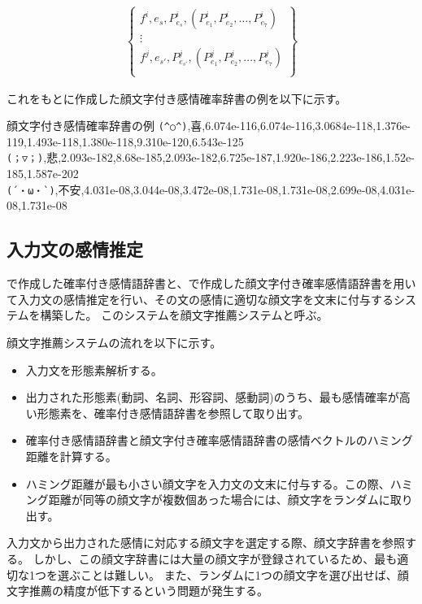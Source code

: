 \documentclass[11pt,a4j]{jsarticle}
\begin{document}
\begin{eqnarray*}
  \left\{
   \begin{array}{c}
     f^i, e_s, P^i_{e_s}, (P^i_{e_1}, P^i_{e_2}, \ldots, P^i_{e_7})\\
     \vdots \\
     f^j, e_{s'}, P^j_{e_{s'}}, (P^j_{e_1}, P^j_{e_2}, \ldots, P^j_{e_7})\\
   \end{array}
  \right\}
\end{eqnarray*}


これをもとに作成した顔文字付き感情確率辞書の例を以下に示す。

\begin{itembox}[l]{顔文字付き感情確率辞書の例}
\verb|(^○^)|,喜,6.074e-116,6.074e-116,3.0684e-118,1.376e-119,1.493e-118,1.380e-118,9.310e-120,6.543e-125\\
\verb|(；▽；)|,悲,2.093e-182,8.68e-185,2.093e-182,6.725e-187,1.920e-186,2.223e-186,1.52e-185,1.587e-202\\
\verb|(´・ω・`)|,不安,4.031e-08,3.044e-08,3.472e-08,1.731e-08,1.731e-08,2.699e-08,4.031e-08,1.731e-08\\
\end{itembox}

\subsection{入力文の感情推定}
で作成した確率付き感情語辞書と、で作成した顔文字付き確率感情語辞書を用いて入力文の感情推定を行い、その文の感情に適切な顔文字を文末に付与するシステムを構築した。
このシステムを顔文字推薦システムと呼ぶ。

顔文字推薦システムの流れを以下に示す。

\begin{itemize}
  \item
    入力文を形態素解析する。
  \item
    出力された形態素(動詞、名詞、形容詞、感動詞)のうち、最も感情確率が高い形態素を、確率付き感情語辞書を参照して取り出す。
  \item
    確率付き感情語辞書と顔文字付き確率感情語辞書の感情ベクトルのハミング距離を計算する。
  \item
    ハミング距離が最も小さい顔文字を入力文の文末に付与する。この際、ハミング距離が同等の顔文字が複数個あった場合には、顔文字をランダムに取り出す。
\end{itemize}

入力文から出力された感情に対応する顔文字を選定する際、顔文字辞書を参照する。
しかし、この顔文字辞書には大量の顔文字が登録されているため、最も適切な1つを選ぶことは難しい。
また、ランダムに1つの顔文字を選び出せば、顔文字推薦の精度が低下するという問題が発生する。
\end{document}
